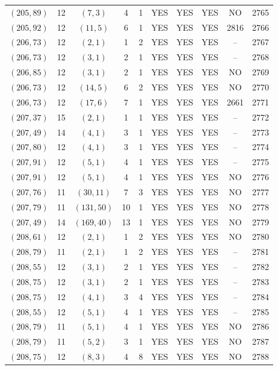 \begin{longtable}{|c|c|c|c|c|c|c|c|c|c|}
$(205, 89)$ & 12 & $(7, 3)$ & 4 & 1 & YES & YES & YES & NO & 2765\\
$(205, 92)$ & 12 & $(11, 5)$ & 6 & 1 & YES & YES & YES & 2816 & 2766\\
$(206, 73)$ & 12 & $(2, 1)$ & 1 & 2 & YES & YES & YES & -- & 2767\\
$(206, 73)$ & 12 & $(3, 1)$ & 2 & 1 & YES & YES & YES & -- & 2768\\
$(206, 85)$ & 12 & $(3, 1)$ & 2 & 1 & YES & YES & YES & NO & 2769\\
$(206, 73)$ & 12 & $(14, 5)$ & 6 & 2 & YES & YES & YES & NO & 2770\\
$(206, 73)$ & 12 & $(17, 6)$ & 7 & 1 & YES & YES & YES & 2661 & 2771\\
$(207, 37)$ & 15 & $(2, 1)$ & 1 & 1 & YES & YES & YES & -- & 2772\\
$(207, 49)$ & 14 & $(4, 1)$ & 3 & 1 & YES & YES & YES & -- & 2773\\
$(207, 80)$ & 12 & $(4, 1)$ & 3 & 1 & YES & YES & YES & -- & 2774\\
$(207, 91)$ & 12 & $(5, 1)$ & 4 & 1 & YES & YES & YES & -- & 2775\\
$(207, 91)$ & 12 & $(5, 1)$ & 4 & 1 & YES & YES & YES & NO & 2776\\
$(207, 76)$ & 11 & $(30, 11)$ & 7 & 3 & YES & YES & YES & NO & 2777\\
$(207, 79)$ & 11 & $(131, 50)$ & 10 & 1 & YES & YES & YES & NO & 2778\\
$(207, 49)$ & 14 & $(169, 40)$ & 13 & 1 & YES & YES & YES & NO & 2779\\
$(208, 61)$ & 12 & $(2, 1)$ & 1 & 2 & YES & YES & YES & NO & 2780\\
$(208, 79)$ & 11 & $(2, 1)$ & 1 & 2 & YES & YES & YES & -- & 2781\\
$(208, 55)$ & 12 & $(3, 1)$ & 2 & 1 & YES & YES & YES & -- & 2782\\
$(208, 75)$ & 12 & $(3, 1)$ & 2 & 1 & YES & YES & YES & -- & 2783\\
$(208, 75)$ & 12 & $(4, 1)$ & 3 & 4 & YES & YES & YES & -- & 2784\\
$(208, 55)$ & 12 & $(5, 1)$ & 4 & 1 & YES & YES & YES & -- & 2785\\
$(208, 79)$ & 11 & $(5, 1)$ & 4 & 1 & YES & YES & YES & NO & 2786\\
$(208, 79)$ & 11 & $(5, 2)$ & 3 & 1 & YES & YES & YES & NO & 2787\\
$(208, 75)$ & 12 & $(8, 3)$ & 4 & 8 & YES & YES & YES & NO & 2788\\

\end{longtable}
